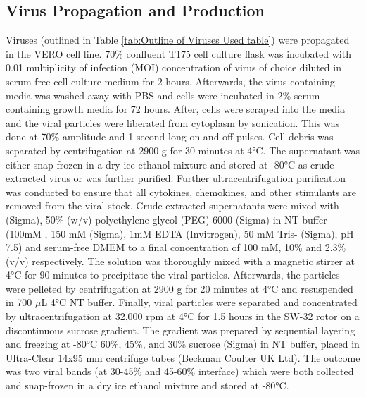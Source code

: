 \subsection{Virus Propagation and Production} \label{subsec:Virus Propagation and Production}
Viruses (outlined in Table \ref{tab:Outline of Viruses Used table}) were propagated in the VERO cell line. 70\% confluent T175 cell culture flask was incubated with 0.01 multiplicity of infection (MOI) concentration of virus of choice diluted in serum-free cell culture medium for 2 hours. Afterwards, the virus-containing media was washed away with PBS and cells were incubated in 2\% serum-containing growth media for 72 hours. After, cells were scraped into the media and the viral particles were liberated from cytoplasm by sonication. This was done at 70\% amplitude and 1 second long on and off pulses. Cell debris was separated by centrifugation at 2900 g for 30 minutes at 4°C. The supernatant was either snap-frozen in a dry ice ethanol mixture and stored at -80°C as crude extracted virus or was further purified. Further ultracentrifugation purification was conducted to ensure that all cytokines, chemokines, and other stimulants are removed from the viral stock. Crude extracted supernatants were mixed with  (Sigma), 50\% (w/v) polyethylene glycol (PEG) 6000 (Sigma) in NT buffer (100mM , 150 mM  (Sigma), 1mM EDTA (Invitrogen), 50 mM Tris- (Sigma), pH 7.5) and serum-free DMEM to a final concentration of 100 mM, 10\% and 2.3\% (v/v) respectively. The solution was thoroughly mixed with a magnetic stirrer at 4°C for 90  minutes to precipitate the viral particles. Afterwards, the particles were pelleted by centrifugation at 2900 g for 20 minutes at 4°C and resuspended in 700 \(\mu\)L 4°C NT buffer. Finally, viral particles were separated and concentrated by ultracentrifugation at 32,000 rpm at 4°C for 1.5 hours in the SW-32 rotor on a discontinuous sucrose gradient. The gradient was prepared by sequential layering and freezing at -80°C 60\%, 45\%, and 30\% sucrose (Sigma) in NT buffer, placed in Ultra-Clear 14x95 mm centrifuge tubes (Beckman Coulter UK Ltd). The outcome was two viral bands (at 30-45\% and 45-60\% interface) which were both collected and snap-frozen in a dry ice ethanol mixture and stored at -80°C.


